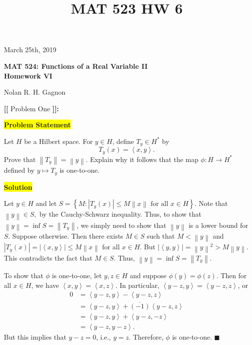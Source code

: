 \documentclass[12pt]{article}
\title{MAT 523 HW 6}
\newcommand\norm[1]{\left\lVert#1\right\rVert}
\newcommand{\mybox}{%
    \collectbox{%
        \setlength{\fboxsep}{2pt}%
        \fbox{\BOXCONTENT}%
    }%
}
\begin{document}
\hfill March 25th, 2019
\begin{center}
\begin{large}
\textbf{MAT 524: Functions of a Real Variable II \\
\vspace{-5mm}
Homework VI \\}
\end{large}
\vspace{-2mm}
Nolan R. H. Gagnon \\
\end{center}

\noindent \textbf{{\huge [}{\Large [}} Problem One \textbf{{\Large ]}{\huge ]}}{\Large \textbf{:}}

\vspace{3mm}

\noindent\mybox{\colorbox{yellow}{\textbf{Problem Statement}}}\hspace{3mm}\hrulefill

\noindent Let $H$ be a Hilbert space. For $y\in H$, define $T_y\in H^{*}$ by $$T_y(x) = \left<x,y\right>.$$ Prove that $\norm{T_y} = \norm{y}.$ Explain why it follows that the map $\phi: H  \longrightarrow H^*$ defined by $y \mapsto T_y$ is one-to-one.

\noindent\mybox{\colorbox{yellow}{\textbf{Solution}}}\hspace{3mm}\hrulefill

\noindent Let $y\in H$ and let $S = \left\lbrace M : \left|T_y(x)\right|\leq M \norm{x} \text{ for all } x \in H\right\rbrace$. Note that $\norm{y} \in S,$ by the Cauchy-Schwarz inequality. Thus, to show that $\norm{y} = \inf S = \norm{T_y}$, we simply need to show that $\norm{y}$ is a lower bound for $S$. Suppose otherwise. Then there exists $M\in S$ such that $M < \norm{y}$ and $|T_y(x)| = |\left<x,y\right>| \leq M \norm{x}$ for all $x\in H$. But $|\left<y,y\right>| = \norm{y}^2 > M\norm{y}.$ This contradicts the fact that $M\in S$. Thus, $\norm{y} = \inf S = \norm{T_y}.$ 

To show that $\phi$ is one-to-one, let $y,z\in H$ and suppose $\phi(y) = \phi(z)$. Then for all $x\in H$, we have $\left<x,y\right>=\left<x,z\right>.$ In particular, $\left<y-z, y\right> = \left<y-z, z\right>$, or
\begin{align}
    0 &= \left<y-z, y\right> - \left<y-z, z\right> \\
    &= \left<y-z, y\right> + \overline{(-1)}\left<y-z, z\right> \\
    &= \left<y-z, y\right> + \left<y-z, -z\right> \\
    &= \left<y-z, y-z\right>. 
\end{align}
But this implies that $y-z = 0$, i.e., $y=z$. Therefore, $\phi$ is one-to-one.
\hfill$\blacksquare$
\end{document}
